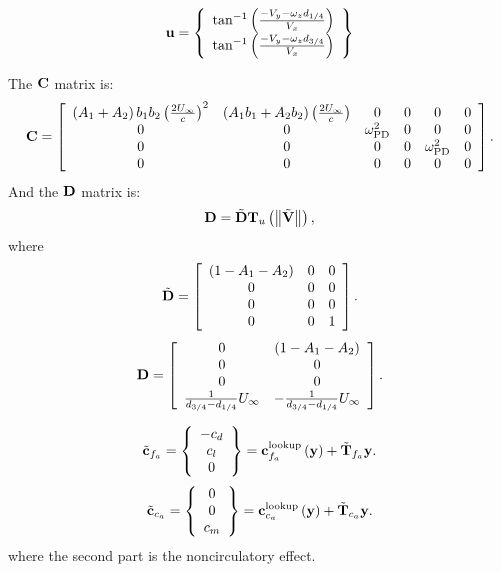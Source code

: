 		

\begin{equation}
	\bm{\mathbf{u}} = \left\{ \begin{array}{c} 
		\tan^{-1} \left(  \frac{-V_y - \omega_z d_{1/4}}{V_x} \right)\\
		\tan^{-1} \left(  \frac{-V_y - \omega_z d_{3/4}}{V_x} \right)\\
	 \end{array} \right\}
\end{equation}
		
The $\bm{\mathbf{C}}$ matrix is:
\begin{equation}
	\bm{\mathbf{C}} = \left[
		\begin{array}{cccccc}
		\left(A_1+A_2\right)b_1 b_2 \left( \frac{2 U_\infty}{c}\right)^2 &
		 \left(A_1  b_1 + A_2 b_2 \right) \left( \frac{2 U_\infty}{c}\right) & 0 & 0 &0 & 0 \\
		0 & 0 & \omega_\text{PD}^2 & 0 & 0 & 0 \\
		0 & 0 & 0 & 0 & \omega_\text{PD}^2 & 0 \\
		0 & 0 & 0 & 0 & 0 & 0 
		\end{array}
		\right].
\end{equation}
And the $\bm{\mathbf{D}}$ matrix is:
\begin{equation}
	\bm{\mathbf{D}} = \tilde{\bm{\mathbf{D}}} \bm{\mathbf{T}}_u \left(  \left\| \tilde{\bm{\mathbf{V}}} \right\| \right),
\end{equation}
where
\begin{equation}
	\tilde{\bm{\mathbf{D}}} = \left[
		\begin{array}{ccc}
		\left( 1 - A_1 - A_2 \right) & 0 & 0 \\
		0 & 0 & 0 \\
		0 & 0 & 0 \\
		0 & 0 & 1
		\end{array}
		\right].
\end{equation}
\begin{equation}
	\bm{\mathbf{D}} = \left[
		\begin{array}{cc}
		0 & \left( 1 -A_1 - A_2 \right) \\
		0 & 0 \\ 
		0 & 0 \\ 
		\frac{1}{d_{3/4}-d_{1/4}} U_\infty & 
		-\frac{1}{d_{3/4}-d_{1/4}} U_\infty \\ 
		\end{array}
		\right].
\end{equation}
	
\begin{equation}
	\tilde{\bm{\mathbf{c}}}_{f_{a}} = \left\{ \begin{array}{c} 
		-c_d \\
		c_l \\
		0
	 \end{array} \right\}
	= \bm{\mathbf{c}}_{f_a}^\text{lookup}\left( \bm{\mathbf{y}} \right) + \tilde{\bm{\mathbf{T}}}_{f_a} \bm{\mathbf{y}}.
\end{equation}
\begin{equation}
	\tilde{\bm{\mathbf{c}}}_{c_{a}} = \left\{
		\begin{array}{c}
		0 \\ 0 \\ c_{m}
		\end{array}
		\right\} = 
		\bm{\mathbf{c}}_{c_a}^\text{lookup}\left( \bm{\mathbf{y}} \right) + \tilde{\bm{\mathbf{T}}}_{c_a} \bm{\mathbf{y}}.
\end{equation}
where the second part is the noncirculatory effect.

